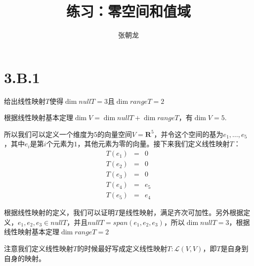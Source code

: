 \documentclass[10pt,a4paper,UTF8]{article}
\author{张朝龙}
\date{}
\title{练习：零空间和值域}
\begin{document}
\maketitle
\tableofcontents
{}


\section{3.B.1}
\label{sec:org9766077}


\begin{problem}
给出线性映射\(T\)使得\(\dim nullT = 3\)且\(\dim range T = 2\)
\end{problem}

\begin{answer}


根据线性映射基本定理\(\dim V = \dim nullT + \dim rangeT\)，有\(\dim V = 5\). 

所以我们可以定义一个维度为5的向量空间\(V= \mathbf{R}^{5}\)，并令这个空间的基为\(e_{1},\ldots ,e_{5}\)，其中\(e_{i}\)是第\(i\)个元素为\(1\)，其他元素为零的向量。接下来我们定义线性映射\(T\)：
\begin{eqnarray}
\label{eq:1}
T(e_{1}) &=& 0 \\
T(e_{2}) &=&0 \\
T(e_{3}) &=&0 \\
T(e_{4}) &=& e_{5}\\
T(e_{5}) &=& e_{4}
\end{eqnarray}

根据线性映射的定义，我们可以证明\(T\)是线性映射，满足齐次可加性。另外根据定义，\(e_{1},e_{2},e_{3}\in nullT\)，并且\(nullT = span(e_{1},e_{2},e_{3})\)，所以\(\dim nullT = 3\)，根据线性映射基本定理\(\dim rangeT = 2\)


注意我们定义线性映射\(T\)的时候最好写成定义线性映射\(T: \mathcal{L}(V,V)\)，即\(T\)是自身到自身的映射。
\end{answer}
\end{document}
